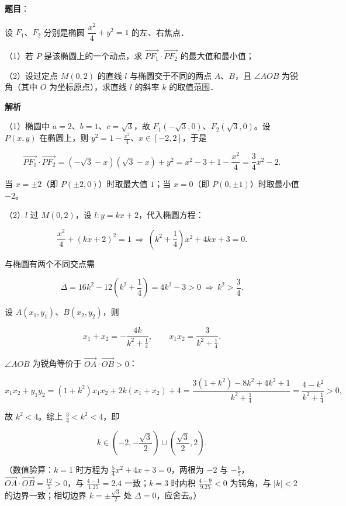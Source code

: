 \begin{answer}

\textbf{题目}：

设 $F_1$、$F_2$ 分别是椭圆 $\dfrac{x^2}{4}+y^2=1$ 的左、右焦点．

（1）若 $P$ 是该椭圆上的一个动点，求 $\overrightarrow{PF_1}\cdot\overrightarrow{PF_2}$ 的最大值和最小值；

（2）设过定点 $M(0,2)$ 的直线 $l$ 与椭圆交于不同的两点 $A$、$B$，且 $\angle AOB$ 为锐角（其中 $O$ 为坐标原点），求直线 $l$ 的斜率 $k$ 的取值范围．

\textbf{解析}

（1）椭圆中 $a=2$、$b=1$、$c=\sqrt3$，故 $F_1(-\sqrt3,0)$、$F_2(\sqrt3,0)$。设 $P(x,y)$ 在椭圆上，则 $y^{2}=1-\frac{x^{2}}{4}$、$x\in[-2,2]$，于是

\nopagebreak[4]
\[\overrightarrow{PF_1}\cdot\overrightarrow{PF_2}=(-\sqrt3-x)(\sqrt3-x)+y^{2}=x^{2}-3+1-\frac{x^{2}}{4}=\frac34x^{2}-2 .\]

当 $x=\pm2$（即 $P(\pm2,0)$）时取最大值 $1$；当 $x=0$（即 $P(0,\pm1)$）时取最小值 $-2$。

（2）$l$ 过 $M(0,2)$，设 $l:y=kx+2$，代入椭圆方程：

\nopagebreak[4]
\[\frac{x^{2}}{4}+(kx+2)^{2}=1\ \Longrightarrow\ \left(k^{2}+\frac14\right)x^{2}+4kx+3=0 .\]

与椭圆有两个不同交点需

\nopagebreak[4]
\[\Delta=16k^{2}-12\left(k^{2}+\frac14\right)=4k^{2}-3>0\ \Longrightarrow\ k^{2}>\frac34 .\]

设 $A(x_1,y_1)$、$B(x_2,y_2)$，则

\nopagebreak[4]
\[x_1+x_2=-\frac{4k}{k^{2}+\frac14},\qquad x_1x_2=\frac{3}{k^{2}+\frac14}.\]

$\angle AOB$ 为锐角等价于 $\overrightarrow{OA}\cdot\overrightarrow{OB}>0$：

\nopagebreak[4]
\[x_1x_2+y_1y_2=(1+k^{2})x_1x_2+2k(x_1+x_2)+4=\frac{3(1+k^{2})-8k^{2}+4k^{2}+1}{k^{2}+\frac14}=\frac{4-k^{2}}{k^{2}+\frac14}>0,\]

故 $k^{2}<4$。综上 $\frac34<k^{2}<4$，即

\nopagebreak[4]
\[k\in\left(-2,-\frac{\sqrt3}{2}\right)\cup\left(\frac{\sqrt3}{2},2\right).\]

（数值验算：$k=1$ 时方程为 $\frac54x^{2}+4x+3=0$，两根为 $-2$ 与 $-\frac65$，$\overrightarrow{OA}\cdot\overrightarrow{OB}=\frac{12}{5}>0$，与 $\frac{4-1}{1.25}=2.4$ 一致；$k=3$ 时内积 $\frac{4-9}{9.25}<0$ 为钝角，与 $|k|<2$ 的边界一致；相切边界 $k=\pm\frac{\sqrt3}{2}$ 处 $\Delta=0$，应舍去。）


\end{answer}
